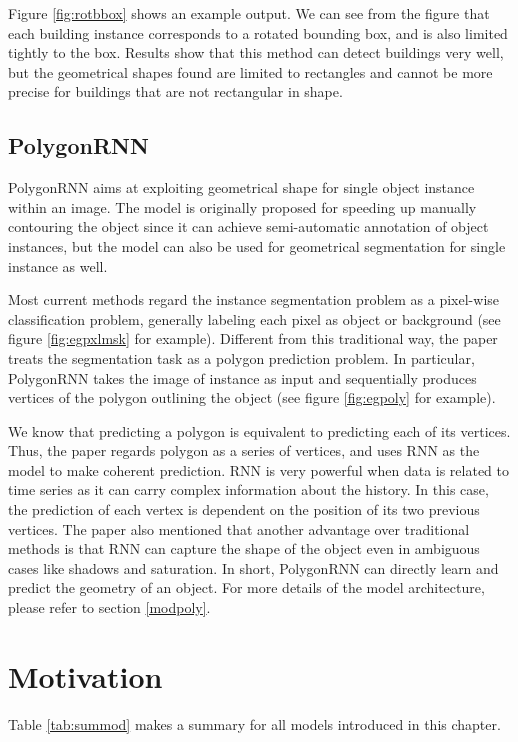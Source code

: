 

Figure \ref{fig:rotbbox} shows an example output. We can see from the figure that each building instance corresponds to a rotated bounding box, and is also limited tightly to the box. Results show that this method can detect buildings very well, but the geometrical shapes found are limited to rectangles and cannot be more precise for buildings that are not rectangular in shape.

\subsection{PolygonRNN}\label{polygonrnn}
PolygonRNN \cite{polygonrnn} aims at exploiting geometrical shape for single object instance within an image. The model is originally proposed for speeding up manually contouring the object since it can achieve semi-automatic annotation of object instances, but the model can also be used for geometrical segmentation for single instance as well.

Most current methods regard the instance segmentation problem as a pixel-wise classification problem, generally labeling each pixel as object or background (see figure \ref{fig:egpxlmsk} for example). Different from this traditional way, the paper treats the segmentation task as a polygon prediction problem. In particular, PolygonRNN takes the image of instance as input and sequentially produces vertices of the polygon outlining the object (see figure \ref{fig:egpoly} for example).



We know that predicting a polygon is equivalent to predicting each of its vertices. Thus, the paper regards polygon as a series of vertices, and uses RNN as the model to make coherent prediction. RNN is very powerful when data is related to time series as it can carry complex information about the history. In this case, the prediction of each vertex is dependent on the position of its two previous vertices. The paper also mentioned that another advantage over traditional methods is that RNN can capture the shape of the object even in ambiguous cases like shadows and saturation. In short, PolygonRNN can directly learn and predict the geometry of an object. For more details of the model architecture, please refer to section \ref{modpoly}.

\section{Motivation}\label{motivation}
Table \ref{tab:summod} makes a summary for all models introduced in this chapter.

